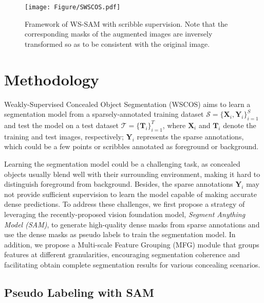 \begin{figure}[t]
	\centering
	\setlength{\abovecaptionskip}{-0.1cm}
	\begin{center}
		\texttt{[image: Figure/SWSCOS.pdf]}
	\end{center}
	\caption{Framework of WS-SAM with scribble supervision. Note that the corresponding masks of the augmented images are inversely transformed so as to be consistent with the original image.
 }
	\label{fig:SWSCOS}
	\vspace{-0.3cm}
\end{figure}

\section{Methodology}
Weakly-Supervised Concealed Object Segmentation (WSCOS) aims to learn a segmentation model from a sparsely-annotated training dataset $\mathcal{S} = \{\mathbf{X}_i, \mathbf{Y}_i\}_{i=1}^{S}$ and test the model on a test dataset $\mathcal{T} = \{\mathbf{T}_i\}_{i=1}^{T}$, where $\mathbf{X}_i$ and $\mathbf{T}_i$ denote the training and test images, respectively; $\mathbf{Y}_i$ represents the sparse annotations, which could be a few points or scribbles annotated as foreground or background.    

Learning the segmentation model could be a challenging task, as concealed objects usually blend well with their surrounding environment, making it hard to distinguish foreground from background. Besides, the sparse annotations $\mathbf{Y}_i$ may not provide sufficient supervision to learn the model capable of making accurate dense predictions. To address these challenges, we first propose a strategy of leveraging the recently-proposed vision foundation model, \emph{Segment Anything Model (SAM)}, to generate high-quality dense masks from sparse annotations and use the dense masks as pseudo labels to train the segmentation model. In addition, we propose a Multi-scale Feature Grouping (MFG) module that groups features at different granularities, encouraging segmentation coherence and facilitating obtain complete segmentation results for various concealing scenarios. 

\subsection{Pseudo Labeling with SAM}\label{Sec:SWSCOS}

